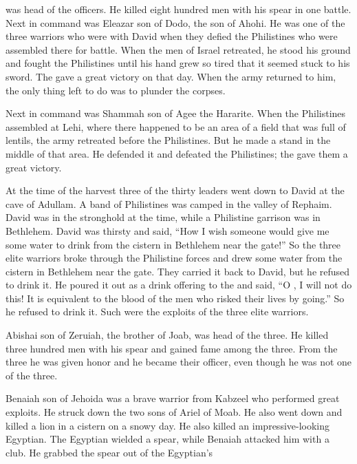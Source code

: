 {was head
of the officers.
He killed
eight
hundred
men with his spear
in one battle.
Next in command
was Eleazar
son
of Dodo,
the son
of Ahohi.
He was one of the three
warriors
who were with
David
when they defied
the Philistines
who were assembled
there
for battle.
When the men
of Israel
retreated,
he
stood
his ground and fought
the Philistines
until
his hand
grew so tired
that
it seemed stuck
to
his sword.
The
{}
gave a great
victory
on that day.
When the army
returned
to him,
the only
thing left to do was to plunder
the corpses.
\par }{\PP {}Next in command
was Shammah
son
of Agee
the Hararite.
When the Philistines
assembled
at Lehi, where there
happened
to be an area
of a field
that was full
of lentils,
the army
retreated
before
the Philistines.
But he made a stand
in the middle
of that area.
He defended
it and defeated
the
Philistines;
the {}
gave them
a great
victory.
\par }{\PP {}At the time of the harvest
three
of the thirty
leaders
went down
to
David
at
the cave
of Adullam.
A band
of Philistines
was camped
in the valley
of Rephaim.
David
was in the stronghold
at the time,
while a Philistine
garrison
was in Bethlehem.
David
was thirsty
and said,
“How I wish
someone would
give me some water
to drink
from the cistern
in Bethlehem
near the gate!”
So the three
elite warriors
broke through
the Philistine
forces and drew
some water
from the cistern
in Bethlehem
near the gate.
They carried
it back
to
David,
but he refused
to drink
it. He poured
it out
as a drink offering to the
{}
and said,
“O
{}, I will not
do
this! It is equivalent to the blood
of the men
who risked their lives
by going.”
So he refused
to drink
it. Such
were the exploits
of the three
elite warriors.
\par }{\PP {}Abishai
son
of Zeruiah,
the brother
of Joab,
was
head
of the three.
He
killed
three
hundred
men with his spear
and gained
fame
among the three.
From
the three
he was given honor
and he became
their officer,
even though he was not
one of the three.
\par }{\PP {}Benaiah
son
of Jehoida
was a brave warrior
from Kabzeel
who performed
great
exploits.
He struck down
the two
sons of Ariel
of Moab.
He also went down
and killed
a lion
in
a cistern
on a snowy
day.
He
also
killed
an
impressive-looking
Egyptian.
The Egyptian
wielded
a spear,
while Benaiah attacked him with a club.
He grabbed
the spear
out of the Egyptian’s
}
